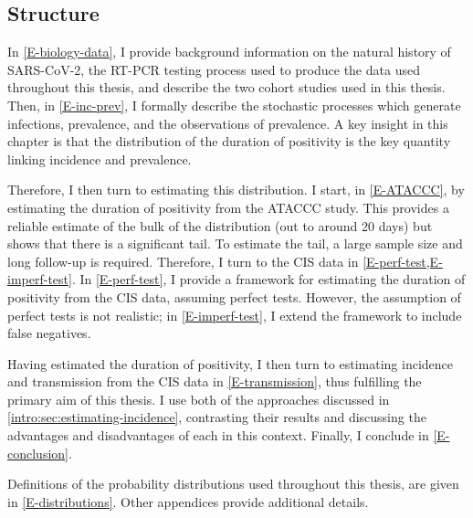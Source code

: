 \documentclass[thesis.tex]{subfiles}
\begin{document}
\subsection{Structure}

In \cref{E-biology-data}, I provide background information on the natural history of SARS-CoV-2, the RT-PCR testing process used to produce the data used throughout this thesis, and describe the two cohort studies used in this thesis.
Then, in \cref{E-inc-prev}, I formally describe the stochastic processes which generate infections, prevalence, and the observations of prevalence.
A key insight in this chapter is that the distribution of the duration of positivity is the key quantity linking incidence and prevalence.

Therefore, I then turn to estimating this distribution.
I start, in \cref{E-ATACCC}, by estimating the duration of positivity from the ATACCC study.
This provides a reliable estimate of the bulk of the distribution (out to around 20 days) but shows that there is a significant tail.
To estimate the tail, a large sample size and long follow-up is required.
Therefore, I turn to the CIS data in \cref{E-perf-test,E-imperf-test}.
In \cref{E-perf-test}, I provide a framework for estimating the duration of positivity from the CIS data, assuming perfect tests.
However, the assumption of perfect tests is not realistic; in \cref{E-imperf-test}, I extend the framework to include false negatives.

Having estimated the duration of positivity, I then turn to estimating incidence and transmission from the CIS data in \cref{E-transmission}, thus fulfilling the primary aim of this thesis.
I use both of the approaches discussed in \cref{intro:sec:estimating-incidence}, contrasting their results and discussing the advantages and disadvantages of each in this context.
Finally, I conclude in \cref{E-conclusion}.

Definitions of the probability distributions used throughout this thesis, are given in \cref{E-distributions}.
Other appendices provide additional details.

\ifSubfilesClassLoaded{
  \appendix
  
  \listoftodos
}{}
\end{document}
